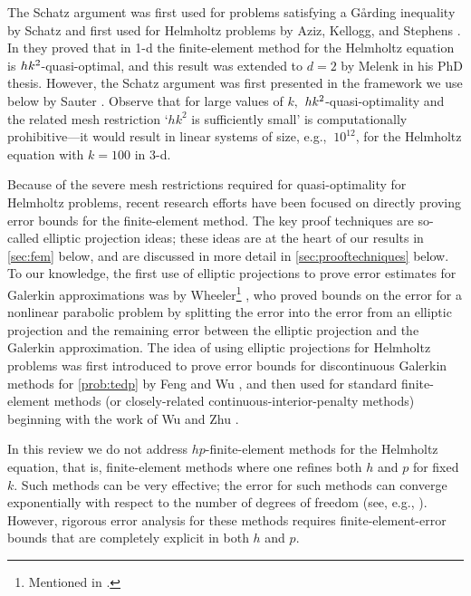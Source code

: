 The Schatz argument was first used for problems satisfying a G\r{a}rding inequality by Schatz \cite{Sc:74} and first used for Helmholtz problems by Aziz, Kellogg, and Stephens \cite{AzKeSt:88}. In \cite{AzKeSt:88} they proved that in 1-d the finite-element method for the Helmholtz equation is $hk^{2}$-quasi-optimal, and this result was extended to $d=2$ by Melenk \cite{Me:95} in his PhD thesis. However, the Schatz argument was first presented in the framework we use below by Sauter \cite[Section 2]{Sa:06}. Observe that for large values of $k,$ $hk^{2}$-quasi-optimality and the related mesh restriction `$hk^2$ is sufficiently small' is computationally prohibitive---it would result in linear systems of size, e.g., $~10^{12}$, for the Helmholtz equation with $k=100$ in 3-d.

Because of the severe mesh restrictions required for quasi-optimality for Helmholtz problems, recent research efforts have been focused on directly proving error bounds for the finite-element method. The key proof techniques are so-called elliptic projection ideas; these ideas are at the heart of our results in \cref{sec:fem} below, and are discussed in more detail in \cref{sec:prooftechniques} below. To our knowledge, the first use of elliptic projections to prove error estimates for Galerkin approximations was by Wheeler\footnote{Mentioned in \cite{MaNo:03}.} \cite[Theorem 3.1 ff.]{Wh:73}, who proved bounds on the error for a nonlinear parabolic problem by splitting the error into the error from an elliptic projection and the remaining error between the elliptic projection and the Galerkin approximation. The idea of using elliptic projections for Helmholtz problems was first introduced to prove error bounds for discontinuous Galerkin methods for \cref{prob:tedp} by Feng and Wu \cite{FeWu:09,FeWu:11}, and then used for standard finite-element methods (or closely-related continuous-interior-penalty methods) beginning with the work of Wu and Zhu \cite{ZhWu:13,Wu:14}.

In this review we do not address $hp$-finite-element methods for the Helmholtz equation, that is, finite-element methods where one refines both $h$ and $p$ for fixed $k.$ Such methods can be very effective; the error for such methods can converge exponentially with respect to the number of degrees of freedom (see, e.g., \cite[Theorem 4.51]{Sc:98}). However, rigorous error analysis for these methods requires finite-element-error bounds that are completely explicit in both $h$ and $p$.

